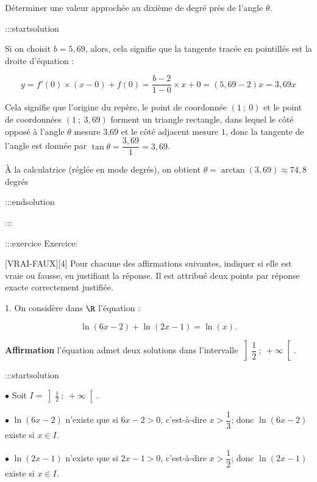 \documentclass{cornouaille}
\begin{document}
Déterminer une valeur approchée au dixième de degré près de l'angle $\theta$.


:::startsolution

Si on choisit $b = 5,69$, alors, cela signifie que la tangente tracée en pointillés est la droite d'équation :

$$
y = f'(0) \times (x - 0) + f(0) = \dfrac{b - 2}{1 - 0} \times x + 0 = (5,69 - 2)x = 3,69x
$$

Cela signifie que l'origine du repère, le point de coordonnée $(1~;~0)$ et le point de coordonnées $(1~;~3,69)$ forment un triangle rectangle, dans lequel le côté opposé à l'angle $\theta$ mesure 3,69 et le côté adjacent mesure $1$, donc la tangente de l'angle est donnée par $\tan \theta = \dfrac{3,69}{1} = 3,69$.

À la calculatrice (réglée en mode degrés), on obtient $\theta = \arctan(3,69) \approx 74,8$ degrés


:::endsolution


:::



:::exercice Exercice:

[VRAI-FAUX][4]
Pour chacune des  affirmations suivantes,
indiquer si elle est vraie ou fausse,
en justifiant la réponse.
Il est attribué deux points par réponse exacte correctement justifiée.







1.   On considère dans $\R$ l'équation :


$$
\ln (6 x - 2) + \ln (2x - 1) = \ln (x).
$$




\textbf{Affirmation} l'équation admet deux solutions dans l'intervalle $\left]\dfrac{1}{2}~;~+ \infty\right[$.


:::startsolution







$\bullet$  Soit $I=\left]\frac{1}{2}~;~+ \infty\right[$.






$\bullet$  $\ln\left (6x-2\right )$ n'existe que si $6x-2>0$, c'est-à-dire $x>\dfrac{1}{3}$; donc $\ln\left (6x-2\right )$ existe si $x\in I$.


$\bullet$  $\ln\left (2x-1\right )$ n'existe que si $2x-1>0$, c'est-à-dire $x>\dfrac{1}{2}$; donc $\ln\left (2x-1\right )$ existe si $x\in I$.
\end{document}
